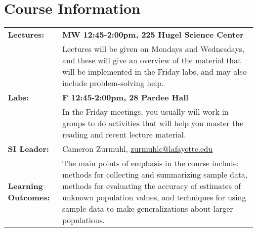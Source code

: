 \documentclass[10pt]{amsart}
\begin{document}
\section*{Course Information}
\noindent
\begin{tabular}{p{1.4in}p{5in}}
  {\bf Lectures:} & {\bf MW 12:45-2:00pm, 225 Hugel Science Center}\\
  			& Lectures will be given on Mondays and Wednesdays, and these will give an overview of the material that will be implemented in the Friday labs, and may also include problem-solving help.\\
  {\bf Labs:}	& {\bf F 12:45-2:00pm, 28 Pardee Hall}\\
  			& In the Friday meetings, you usually will work in groups to do activities that will help you master the reading and recent lecture material.\\
  {\bf SI Leader:} &  Cameron Zurmuhl, \href{mailto:zurmuhlc@lafayette.edu}{zurmuhlc@lafayette.edu}\\
  {\bf Learning Outcomes:}
  & The main points of emphasis in the course include: methods for collecting and summarizing sample data,
   methods for evaluating the accuracy of estimates of unknown population values, and
   techniques for using sample data to make generalizations about larger populations.\\
 
 \end{tabular}
 
 
\end{document}
